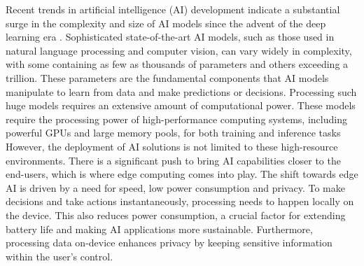Recent trends in artificial intelligence (AI) development indicate a substantial surge in the complexity and size of AI models since the advent of the deep learning era \autocite{EpochNotableModels2024}.
Sophisticated state-of-the-art AI models, such as those used in natural language processing and computer vision, can vary widely in complexity, with some containing as few as thousands of parameters and others exceeding a trillion.
These parameters are the fundamental components that AI models manipulate to learn from data and make predictions or decisions.
Processing such huge models requires an extensive amount of computational power.
These models require the processing power of high-performance computing systems, including powerful GPUs and large memory pools, for both training and inference tasks
However, the deployment of AI solutions is not limited to these high-resource environments.
There is a significant push to bring AI capabilities closer to the end-users, which is where edge computing comes into play.
The shift towards edge AI is driven by a need for speed, low power consumption and privacy.
To make decisions and take actions instantaneously, processing needs to happen locally on the device.
This also reduces power consumption, a crucial factor for extending battery life and making AI applications more sustainable. 
Furthermore, processing data on-device enhances privacy by keeping sensitive information within the user's control.
